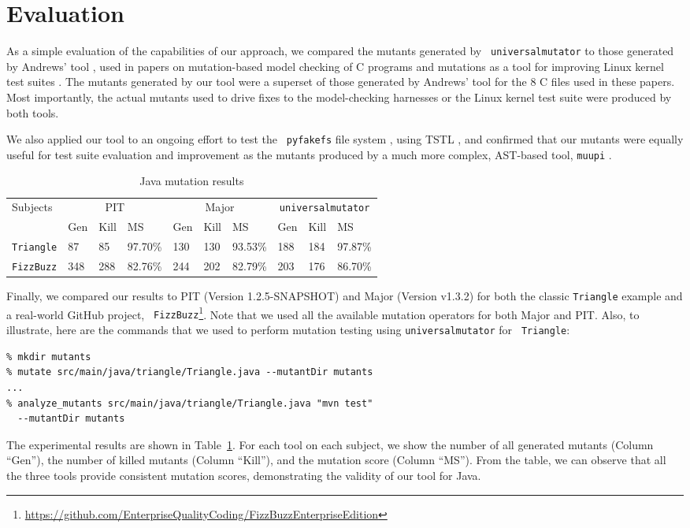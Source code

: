 \section{Evaluation}

As a simple evaluation of the capabilities of our approach, we compared the mutants generated by {\tt
  universalmutator} to those generated by Andrews' tool \cite{mutant},
used in papers on mutation-based model checking of C programs
\cite{ASE15} and mutations as a tool for improving Linux kernel test
suites \cite{mutation17}.  The mutants generated by our tool were a
superset of those generated by Andrews' tool for the 8 C files used in
these papers.  Most importantly, the actual mutants used to drive
fixes to the model-checking harnesses or the Linux kernel test suite
were produced by both tools.

We also applied our tool to an ongoing effort to test the {\tt
  pyfakefs} file system \cite{pyfakefs}, using TSTL \cite{nfm15,tstlsttt},
and confirmed that our mutants were equally useful for test suite
evaluation and improvement as the mutants produced by a much more
complex, AST-based tool, {\tt muupi} \cite{muupi}.
\begin{table}[t!]
  \scriptsize
  \caption{\label{tab:java} Java mutation results}
  \begin{tabular}{|l|lll|lll|lll|}
    \hline
    Subjects&\multicolumn{3}{c|}{PIT}&\multicolumn{3}{c|}{Major}&\multicolumn{3}{c|}{{\tt universalmutator}}\\
    &Gen&Kill&MS&Gen&Kill&MS&Gen&Kill&MS\\\hline
\hline
    {\tt Triangle}&87&85&97.70\%&130&130&93.53\%&188&184&97.87\%\\
{\tt FizzBuzz}&348&288&82.76\%&244&202&82.79\%&203&176&86.70\%\\
  \hline\end{tabular}
  \end{table}

Finally, we compared our results to PIT (Version 1.2.5-SNAPSHOT)
\cite{pittest} and Major (Version v1.3.2) \cite{major} for both the
classic {\tt Triangle} example and a real-world GitHub project, {\tt
  FizzBuzz}\footnote{\url{https://github.com/EnterpriseQualityCoding/FizzBuzzEnterpriseEdition}
}.  Note that we used all the available mutation operators for both
Major and PIT. Also, to illustrate, here are the commands that we used to
perform mutation testing using {\tt universalmutator} for {\tt
  Triangle}:
{\scriptsize
\begin{verbatim}
% mkdir mutants
% mutate src/main/java/triangle/Triangle.java --mutantDir mutants
...
% analyze_mutants src/main/java/triangle/Triangle.java "mvn test"
  --mutantDir mutants
\end{verbatim}
} The experimental results are shown in Table~\ref{tab:java}. For each
tool on each subject, we show the number of all generated mutants
(Column ``Gen''), the number of killed mutants (Column ``Kill''), and
the mutation score (Column ``MS''). From the table, we can observe that all the three tools provide consistent mutation scores, demonstrating the validity of our tool for Java.

